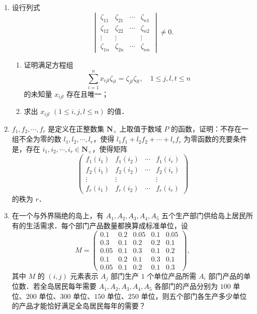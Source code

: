 \begin{enumerate}
\begin{enumerate}
  \anssub
  \end{enumerate}
  \item 设行列式
  \[
    \begin{vmatrix}
      \zeta_{11}&\zeta_{21}&\cdots&\zeta_{n1}\\
      \zeta_{12}&\zeta_{22}&\cdots&\zeta_{n2}\\
      \vdots&\vdots&&\vdots\\
      \zeta_{1n}&\zeta_{2n}&\cdots&\zeta_{nn}
    \end{vmatrix}\ne 0.
  \]
  \begin{enumerate}
    \item 证明满足方程组
    \[
      \sum_{i=1}^{n}x_{ijl}\zeta_{it}=\zeta_{jt}\zeta_{lt},\quad 1\le j,l,t\le n
    \]
    的未知量 $x_{ijl}$ 存在且唯一；
  \anssub
    \item 求出 $x_{ijl}$ $(1\le i,j,l\le n)$ 的值．
  \anssub
  \end{enumerate}
  \item $f_1,f_2,\cdots,f_r$ 是定义在正整数集 $\mathbf{N}_+$ 上取值于数域 $P$ 的函数，证明：不存在一组不全为零的数 $l_1,l_2,\cdots,l_r$，使得 $l_1f_1+l_2f_2+\cdots+l_rf_r$ 为零函数的充要条件是，存在 $i_1,i_2,\cdots,i_r\in\mathbf{N}_+$，使得矩阵
  \[
    \begin{pmatrix}
      f_1(i_1)&f_1(i_2)&\cdots&f_1(i_r)\\
      f_2(i_1)&f_2(i_2)&\cdots&f_2(i_r)\\
      \vdots&\vdots&&\vdots\\
      f_r(i_1)&f_r(i_2)&\cdots&f_r(i_r)
    \end{pmatrix}
  \]
  的秩为 $r$．
  \ansproof
  \item 在一个与外界隔绝的岛上，有 $A_1,A_2,A_3,A_4,A_5$ 五个生产部门供给岛上居民所有的生活需求．每个部门产品数量都换算成标准单位，设
  \[
    M=\begin{pmatrix}
      0.1&0.2&0.05&0.1&0.05\\
      0.3&0.1&0.2&0.2&0.1\\
      0.05&0.1&0.3&0.1&0.2\\
      0.1&0.2&0.1&0.3&0.1\\
      0.05&0.1&0.2&0.1&0.3
    \end{pmatrix},
  \]
  其中 $M$ 的 $(i,j)$ 元素表示 $A_j$ 部门生产 $1$ 个单位产品所需 $A_i$ 部门产品的单位数．若全岛居民每年需要 $A_1,A_2,A_3,A_4,A_5$ 各部门的产品分别为 $100$ 单位、$200$ 单位、$300$ 单位、$150$ 单位、$250$ 单位，则五个部门各生产多少单位的产品才能恰好满足全岛居民每年的需要？
  \anscompute
\end{enumerate}
